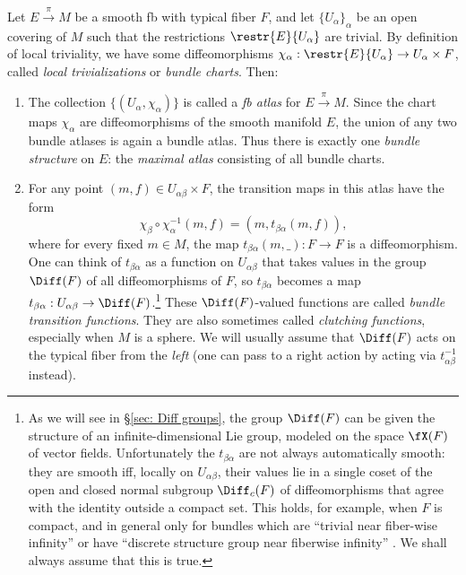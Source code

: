 \begin{defn}\label{def G-bundle}
    Let $E\overset{\pi}{\to}M$ be a smooth \gls{fb} with typical fiber $F$, and let $\{U_\alpha\}_\alpha$ be an open covering of $M$ such that the restrictions $\restr{E}{U_\alpha}$ are trivial. By definition of local triviality, we have some diffeomorphisms $\chi_\alpha: \restr{E}{U_\alpha}\to U_\alpha\times F$, called \emph{local trivializations} or \emph{bundle charts}. Then:
\begin{enumerate}
    \item The collection $\{(U_\alpha,\chi_\alpha)\}$ is called a \emph{\gls{fb} atlas} for $E\overset{\pi}{\to}M$. Since the chart maps $\chi_\alpha$ are diffeomorphisms of the smooth manifold $E$, the union of any two bundle atlases is again a bundle atlas. Thus there is exactly one \emph{bundle structure} on $E$: the \emph{maximal atlas} consisting of all bundle charts.
    \item For any point $(m,f)\in U_{\alpha\beta}\times F$, the transition maps in this atlas have the form \[\chi_\beta\circ\chi_\alpha^{-1} (m,f)=(m, t_{\beta\alpha}(m,f)),\label{eq transition functions}\]
    where for every fixed $m\in M$, the map $t_{\beta\alpha}(m,\_):F\to F$ is a diffeomorphism. One can think of $t_{\beta\alpha}$ as a function on $U_{\alpha\beta}$ that takes values in the group $\Diff(F)$ of all diffeomorphisms of $F$, so $t_{\beta\alpha}$ becomes a map $t_{\beta\alpha}:U_{\alpha\beta}\to \Diff(F)$.\footnote{As we will see in \S\ref{sec: Diff groups}, the group $\Diff(F)$ can be given the structure of an infinite-dimensional Lie group, modeled on the space $\fX(F)$ of vector fields. Unfortunately the $t_{\beta\alpha}$ are not always automatically smooth: they are smooth iff, locally on $U_{\alpha\beta}$, their values lie in a single coset of the open and closed normal subgroup $\Diff_c(F)$ of diffeomorphisms that agree with the identity outside a compact set. This holds, for example, when $F$ is compact, and in general only for bundles which are ``trivial near fiber-wise infinity'' or have ``discrete structure group near fiberwise infinity'' \cite{Michor}. We shall always assume that this is true.}
    These $\Diff(F)$-valued functions are called \emph{bundle transition functions}. They are also sometimes called \emph{clutching functions}, especially when $M$ is a sphere. We will usually assume that $\Diff(F)$ acts on the typical fiber from the \emph{left} (one can pass to a right action by acting via $t_{\alpha\beta}^{-1}$ instead).
\end{enumerate}
\end{defn}

